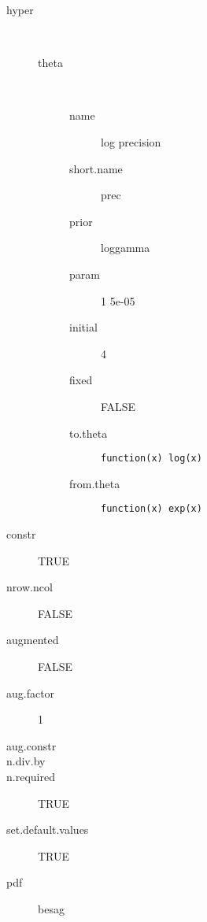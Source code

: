 \begin{description}
	\item[hyper]\ 
	 \begin{description}
	 	\item[theta]\ 
	 	 \begin{description}
	 	 	\item[name] log precision
	 	 	\item[short.name] prec
	 	 	\item[prior] loggamma
	 	 	\item[param] 1 5e-05
	 	 	\item[initial] 4
	 	 	\item[fixed] FALSE
	 	 	\item[to.theta] \verb|function(x) log(x)|
	 	 	\item[from.theta] \verb|function(x) exp(x)|
	 	 \end{description}
	 \end{description}
	\item[constr] TRUE
	\item[nrow.ncol] FALSE
	\item[augmented] FALSE
	\item[aug.factor] 1
	\item[aug.constr] 
	\item[n.div.by] 
	\item[n.required] TRUE
	\item[set.default.values] TRUE
	\item[pdf] besag
\end{description}
